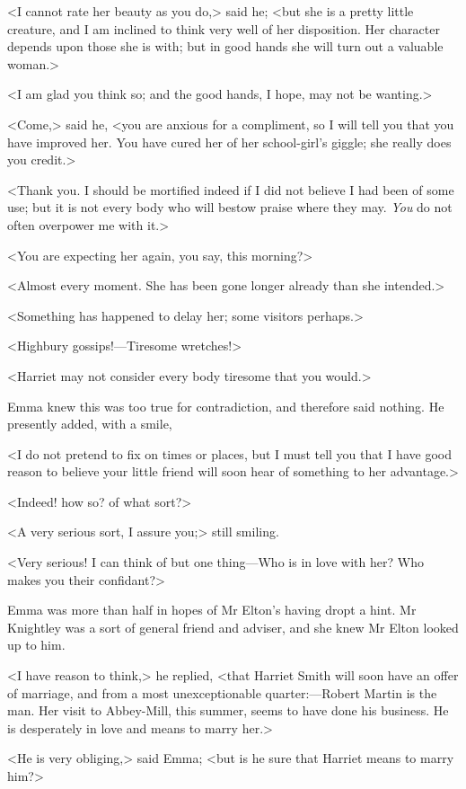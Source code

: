 <I cannot rate her beauty as you do,> said he; <but she is a pretty little creature, and I am inclined to think very well of her disposition. Her character depends upon those she is with; but in good hands she will turn out a valuable woman.>

<I am glad you think so; and the good hands, I hope, may not be wanting.>

<Come,> said he, <you are anxious for a compliment, so I will tell you that you have improved her. You have cured her of her school-girl's giggle; she really does you credit.>

<Thank you. I should be mortified indeed if I did not believe I had been of some use; but it is not every body who will bestow praise where they may. \textit{You} do not often overpower me with it.>

<You are expecting her again, you say, this morning?>

<Almost every moment. She has been gone longer already than she intended.>

<Something has happened to delay her; some visitors perhaps.>

<Highbury gossips!—Tiresome wretches!>

<Harriet may not consider every body tiresome that you would.>

Emma knew this was too true for contradiction, and therefore said nothing. He presently added, with a smile,

<I do not pretend to fix on times or places, but I must tell you that I have good reason to believe your little friend will soon hear of something to her advantage.>

<Indeed! how so? of what sort?>

<A very serious sort, I assure you;> still smiling.

<Very serious! I can think of but one thing—Who is in love with her? Who makes you their confidant?>

Emma was more than half in hopes of Mr Elton's having dropt a hint. Mr Knightley was a sort of general friend and adviser, and she knew Mr Elton looked up to him.

<I have reason to think,> he replied, <that Harriet Smith will soon have an offer of marriage, and from a most unexceptionable quarter:—Robert Martin is the man. Her visit to Abbey-Mill, this summer, seems to have done his business. He is desperately in love and means to marry her.>

<He is very obliging,> said Emma; <but is he sure that Harriet means to marry him?>

